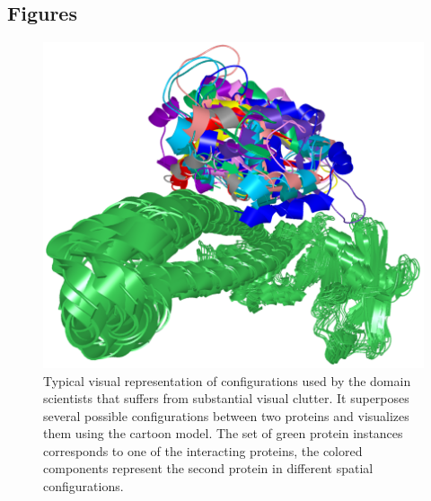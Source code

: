 \documentclass{bmcart}
\begin{document}
\begin{backmatter}




\section*{Figures}
  \begin{figure}[h!]
  \centering
  \includegraphics[width=0.9\columnwidth]{images/figure1.png}
 \caption{
	Typical visual representation of configurations used by the domain scientists that suffers from substantial visual clutter. It superposes several possible configurations between two proteins and visualizes them using the cartoon model. The set of green protein instances corresponds to one of the interacting proteins, the colored components represent the second protein in different spatial configurations.}
  \label{fig:problem}
\end{figure}


\end{backmatter}
\end{document}
